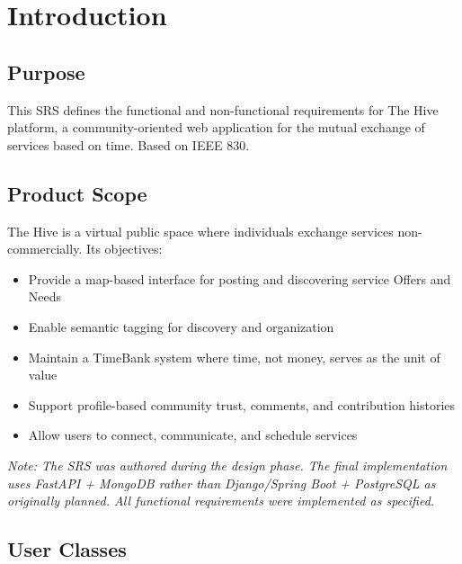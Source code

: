 \documentclass[10pt,a4paper]{report}
\begin{document}
\section{Introduction}

\subsection{Purpose}

This SRS defines the functional and non-functional requirements for The Hive platform, a community-oriented web application for the mutual exchange of services based on time. Based on IEEE 830.

\subsection{Product Scope}

The Hive is a virtual public space where individuals exchange services non-commercially. Its objectives:
\begin{itemize}
    \item Provide a map-based interface for posting and discovering service Offers and Needs
    \item Enable semantic tagging for discovery and organization
    \item Maintain a TimeBank system where time, not money, serves as the unit of value
    \item Support profile-based community trust, comments, and contribution histories
    \item Allow users to connect, communicate, and schedule services
\end{itemize}

\textit{Note: The SRS was authored during the design phase. The final implementation uses FastAPI + MongoDB rather than Django/Spring Boot + PostgreSQL as originally planned. All functional requirements were implemented as specified.}

\subsection{User Classes}
\end{document}
